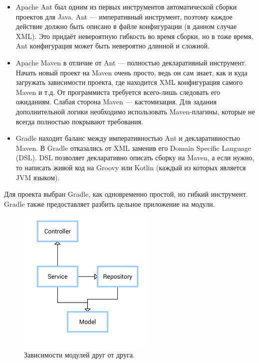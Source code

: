 \begin{itemize}
    \item Apache Ant был одним из первых инструментов автоматической сборки проектов для Java.
          Ant --- императивный инструмент, поэтому каждое действие должно быть описано в файле конфигурации (в данном случае XML).
          Это придаёт невероятную гибкость во время сборки, но в тоже время, Ant конфигурация может быть невероятно длинной и сложной.
    \item Apache Maven в отличие от Ant --- полностью декларативный инструмент.
          Начать новый проект на Maven очень просто, ведь он сам знает, как и куда загружать зависимости проекта, где находится XML конфигурация самого Maven и т.д.
          От программиста требуется всего-лишь следовать его ожиданиям.
          Слабая сторона Maven --- кастомизация.
          Для задания дополнительной логики необходимо использовать Maven-плагины, которые не всегда полностью покрывают требования.
    \item Gradle находит баланс между императивностью Ant и декларативностью Maven.
          В Gradle отказались от XML заменив его Domain Specific Language (DSL).
          DSL позволяет декларативно описать сборку на Maven, а если нужно, то написать живой код на Groovy или Kotlin (каждый из которых является JVM языком).
\end{itemize}

Для проекта выбран Gradle, как одновременно простой, но гибкий инструмент.
Gradle также предоставляет разбить цельное приложение на модули.

\begin{figure}[ht]
    \centering
    \includegraphics[width=0.6\textwidth]{../resources/moduleDependencies.png}
    \caption{Зависимости модулей друг от друга.}
    \label{fig:moduleDependencies}
\end{figure}

